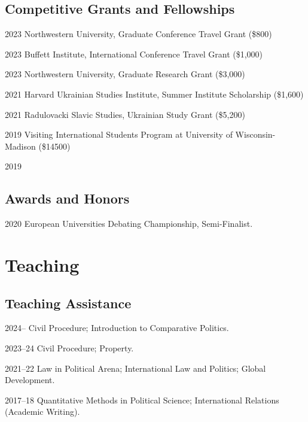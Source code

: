 \documentclass[11pt,letterpaper]{report}
\begin{document}
    \subsection*{Competitive Grants and Fellowships}

    \begin{tablist}


        \item[2023] \tab{}Northwestern University, Graduate Conference Travel Grant (\$800)
        \item[2023] \tab{}Buffett Institute, International Conference Travel Grant (\$1,000)
        \item[2023] \tab{}Northwestern University, Graduate Research Grant (\$3,000)
        \item[2021] \tab{}Harvard Ukrainian Studies Institute, Summer Institute Scholarship (\$1,600)
        \item[2021] \tab{}Radulovacki Slavic Studies, Ukrainian Study Grant (\$5,200)
        \item[2019] \tab{}Visiting International Students Program at University of Wisconsin-Madison (\$14500)
        \item[2019]  

    \end{tablist}

    \subsection*{Awards and Honors}

    \begin{tablist}

        \item[2020] \tab{}European Universities Debating Championship, Semi-Finalist. 
    \end{tablist}

    \section*{Teaching}

    \subsection*{Teaching Assistance}

    \begin{tablist}
        

        
        \item[2024--]      \tab{}Civil Procedure; Introduction to Comparative Politics.
        \item[2023--24]    \tab{}Civil Procedure; Property.
        \item[2021--22]    \tab{}Law in Political Arena; International Law and Politics; Global Development.
        \item[2017--18]    \tab{}Quantitative Methods in Political Science; International Relations (Academic Writing).

    \end{tablist}
\end{document}
